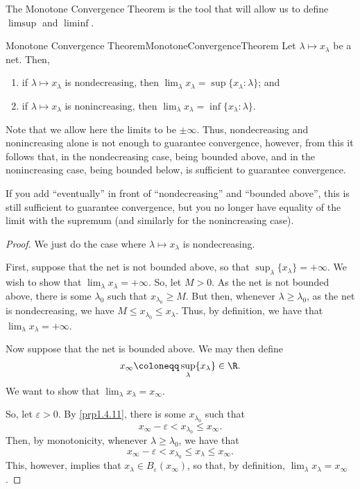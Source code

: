 The Monotone Convergence Theorem is the tool that will allow us to define $\limsup$ and $\liminf$.
\begin{prp}{Monotone Convergence Theorem}{MonotoneConvergenceTheorem}
Let $\lambda \mapsto x_{\lambda}$ be a net.  Then,
\begin{enumerate}
\item if $\lambda \mapsto x_{\lambda}$ is nondecreasing, then $\lim _{\lambda}x_{\lambda}=\sup \{ x_{\lambda}:\lambda \}$; and
\item if $\lambda \mapsto x_{\lambda}$ is nonincreasing, then $\lim _{\lambda}x_{\lambda}=\inf \{ x_{\lambda}:\lambda \}$.
\end{enumerate}
\begin{rmk}
Note that we allow here the limits to be $\pm \infty$.  Thus, nondecreasing and nonincreasing alone is not enough to guarantee convergence, however, from this it follows that, in the nondecreasing case, being bounded above, and in the nonincreasing case, being bounded below, is sufficient to guarantee convergence.
\end{rmk}
\begin{rmk}
If you add ``eventually'' in front of ``nondecreasing'' and ``bounded above'', this is still sufficient to guarantee convergence, but you no longer have equality of the limit with the supremum (and similarly for the nonincreasing case).
\end{rmk}
\begin{proof}
We just do the case where $\lambda \mapsto x_\lambda$ is nondecreasing.

First, suppose that the net is not bounded above, so that $\sup _{\lambda}\{ x_{\lambda}\} =+\infty$.  We wish to show that $\lim _{\lambda}x_{\lambda}=+\infty$.  So, let $M>0$.  As the net is not bounded above, there is some $\lambda _0$ such that $x_{\lambda _0}\geq M$.  But then, whenever $\lambda \geq \lambda _0$, as the net is nondecreasing, we have $M\leq x_{\lambda _0}\leq x_{\lambda}$.  Thus, by definition, we have that $\lim _{\lambda}x_{\lambda}=+\infty$.

Now suppose that the net is bounded above.  We may then define
\begin{equation}
x_\infty \coloneqq \sup _{\lambda}\{ x_\lambda \} \in \R .
\end{equation}
We want to show that $\lim _\lambda x_\lambda =x_\infty$.

So, let $\varepsilon >0$.  By \cref{prp1.4.11}, there is some $x_{\lambda _0}$ such that
\begin{equation}
x_\infty-\varepsilon <x_{\lambda _0}\leq x_\infty.
\end{equation}
Then, by monotonicity, whenever $\lambda \geq \lambda _0$, we have that
\begin{equation}
x_\infty-\varepsilon <x_{\lambda _0}\leq x_\lambda \leq x_\infty.
\end{equation}
This, however, implies that $x_\lambda \in B_{\varepsilon}(x_\infty )$, so that, by definition, $\lim _\lambda x_\lambda =x_\infty$.
\end{proof}
\end{prp}
